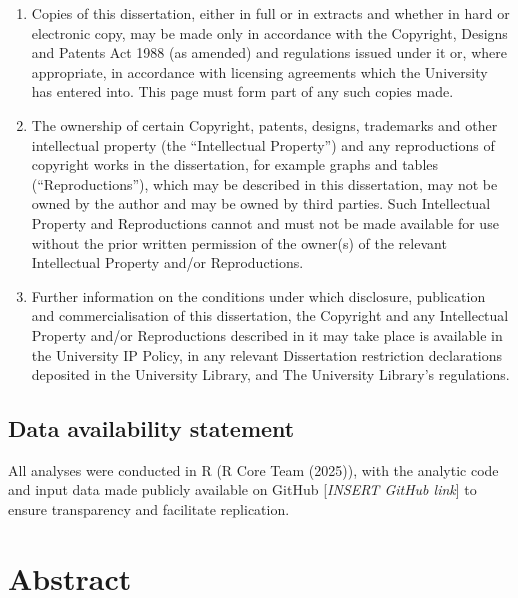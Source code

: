 \documentclass[
]{article}
\begin{document}
\begin{enumerate}
\def\labelenumi{\roman{enumi}.}
\item
  Copies of this dissertation, either in full or in extracts and whether
  in hard or electronic copy, may be made only in accordance with the
  Copyright, Designs and Patents Act 1988 (as amended) and regulations
  issued under it or, where appropriate, in accordance with licensing
  agreements which the University has entered into. This page must form
  part of any such copies made.
\item
  The ownership of certain Copyright, patents, designs, trademarks and
  other intellectual property (the ``Intellectual Property'') and any
  reproductions of copyright works in the dissertation, for example
  graphs and tables (``Reproductions''), which may be described in this
  dissertation, may not be owned by the author and may be owned by third
  parties. Such Intellectual Property and Reproductions cannot and must
  not be made available for use without the prior written permission of
  the owner(s) of the relevant Intellectual Property and/or
  Reproductions.
\item
  Further information on the conditions under which disclosure,
  publication and commercialisation of this dissertation, the Copyright
  and any Intellectual Property and/or Reproductions described in it may
  take place is available in the University IP Policy, in any relevant
  Dissertation restriction declarations deposited in the University
  Library, and The University Library's regulations.
\end{enumerate}

\subsection{Data availability
statement}\label{data-availability-statement}

All analyses were conducted in R (R Core Team (2025)), with the analytic
code and input data made publicly available on GitHub {[}\emph{INSERT
GitHub link}{]} to ensure transparency and facilitate replication.

\section{Abstract}\label{abstract}
\end{document}
